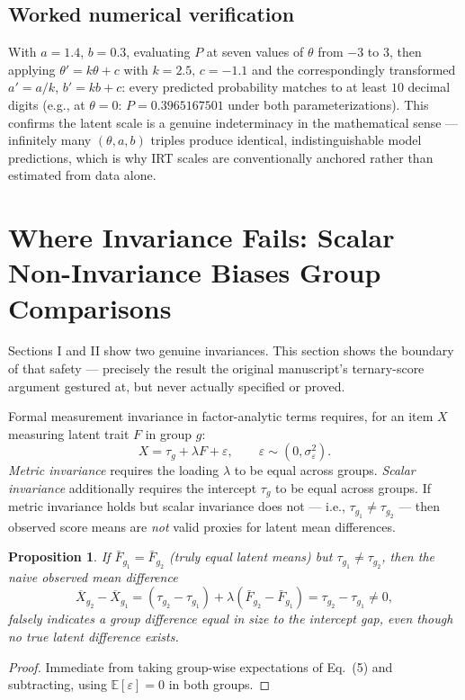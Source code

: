 \documentclass[10pt,journal,compsoc]{IEEEtran}
\newtheorem{proposition}{Proposition}
\begin{document}
\subsection{Worked numerical verification}
With $a=1.4$, $b=0.3$, evaluating $P$ at seven values of $\theta$ from $-3$ to $3$, then applying $\theta'=k\theta+c$ with $k=2.5,\,c=-1.1$ and the correspondingly transformed $a'=a/k$, $b'=kb+c$: every predicted probability matches to at least $10$ decimal digits (e.g., at $\theta=0$: $P=0.3965167501$ under both parameterizations). This confirms the latent scale is a genuine indeterminacy in the mathematical sense — infinitely many $(\theta,a,b)$ triples produce identical, indistinguishable model predictions, which is why IRT scales are conventionally anchored rather than estimated from data alone.

\section{Where Invariance Fails: Scalar Non-Invariance Biases Group Comparisons}
Sections I and II show two genuine invariances. This section shows the boundary of that safety — precisely the result the original manuscript's ternary-score argument gestured at, but never actually specified or proved.

Formal measurement invariance in factor-analytic terms requires, for an item $X$ measuring latent trait $F$ in group $g$:
\begin{equation}
    X = \tau_g + \lambda F + \varepsilon, \qquad \varepsilon \sim (0,\sigma^2_\varepsilon).
\end{equation}
\emph{Metric invariance} requires the loading $\lambda$ to be equal across groups. \emph{Scalar invariance} additionally requires the intercept $\tau_g$ to be equal across groups. If metric invariance holds but scalar invariance does not — i.e., $\tau_{g_1}\ne\tau_{g_2}$ — then observed score means are \emph{not} valid proxies for latent mean differences.

\begin{proposition}
If $\bar F_{g_1}=\bar F_{g_2}$ (truly equal latent means) but $\tau_{g_1}\ne\tau_{g_2}$, then the naive observed mean difference
\begin{equation}
    \overline{X}_{g_2}-\overline{X}_{g_1} = (\tau_{g_2}-\tau_{g_1}) + \lambda(\bar F_{g_2}-\bar F_{g_1}) = \tau_{g_2}-\tau_{g_1} \ne 0,
\end{equation}
falsely indicates a group difference equal in size to the intercept gap, even though no true latent difference exists.
\end{proposition}
\begin{proof}
Immediate from taking group-wise expectations of Eq.~(5) and subtracting, using $\mathbb{E}[\varepsilon]=0$ in both groups.
\end{proof}
\end{document}
